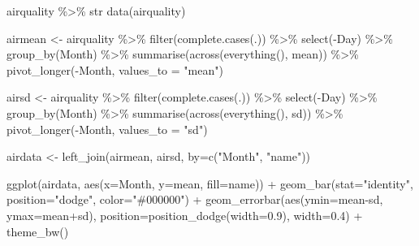 \documentclass[
]{book}
\newenvironment{Shaded}{\begin{snugshade}}{\end{snugshade}}
\newcommand{\AttributeTok}[1]{\textcolor[rgb]{0.77,0.63,0.00}{#1}}
\newcommand{\FloatTok}[1]{\textcolor[rgb]{0.00,0.00,0.81}{#1}}
\newcommand{\FunctionTok}[1]{\textcolor[rgb]{0.00,0.00,0.00}{#1}}
\newcommand{\NormalTok}[1]{#1}
\newcommand{\OtherTok}[1]{\textcolor[rgb]{0.56,0.35,0.01}{#1}}
\newcommand{\SpecialCharTok}[1]{\textcolor[rgb]{0.00,0.00,0.00}{#1}}
\newcommand{\StringTok}[1]{\textcolor[rgb]{0.31,0.60,0.02}{#1}}
\begin{document}
\begin{Shaded}
\begin{Highlighting}[]
\NormalTok{airquality }\SpecialCharTok{\%\textgreater{}\%}\NormalTok{ str}
\FunctionTok{data}\NormalTok{(airquality)}

\NormalTok{airmean }\OtherTok{\textless{}{-}}\NormalTok{  airquality }\SpecialCharTok{\%\textgreater{}\%} 
  \FunctionTok{filter}\NormalTok{(}\FunctionTok{complete.cases}\NormalTok{(.)) }\SpecialCharTok{\%\textgreater{}\%} 
  \FunctionTok{select}\NormalTok{(}\SpecialCharTok{{-}}\NormalTok{Day) }\SpecialCharTok{\%\textgreater{}\%} 
  \FunctionTok{group\_by}\NormalTok{(Month) }\SpecialCharTok{\%\textgreater{}\%} 
  \FunctionTok{summarise}\NormalTok{(}\FunctionTok{across}\NormalTok{(}\FunctionTok{everything}\NormalTok{(), mean)) }\SpecialCharTok{\%\textgreater{}\%} 
  \FunctionTok{pivot\_longer}\NormalTok{(}\SpecialCharTok{{-}}\NormalTok{Month, }\AttributeTok{values\_to =} \StringTok{"mean"}\NormalTok{)}

\NormalTok{airsd }\OtherTok{\textless{}{-}}\NormalTok{ airquality }\SpecialCharTok{\%\textgreater{}\%} 
  \FunctionTok{filter}\NormalTok{(}\FunctionTok{complete.cases}\NormalTok{(.)) }\SpecialCharTok{\%\textgreater{}\%} 
  \FunctionTok{select}\NormalTok{(}\SpecialCharTok{{-}}\NormalTok{Day) }\SpecialCharTok{\%\textgreater{}\%} 
  \FunctionTok{group\_by}\NormalTok{(Month) }\SpecialCharTok{\%\textgreater{}\%} 
  \FunctionTok{summarise}\NormalTok{(}\FunctionTok{across}\NormalTok{(}\FunctionTok{everything}\NormalTok{(), sd)) }\SpecialCharTok{\%\textgreater{}\%} 
  \FunctionTok{pivot\_longer}\NormalTok{(}\SpecialCharTok{{-}}\NormalTok{Month, }\AttributeTok{values\_to =} \StringTok{"sd"}\NormalTok{)}


\NormalTok{airdata }\OtherTok{\textless{}{-}} \FunctionTok{left\_join}\NormalTok{(airmean, airsd, }\AttributeTok{by=}\FunctionTok{c}\NormalTok{(}\StringTok{"Month"}\NormalTok{, }\StringTok{"name"}\NormalTok{))}

\FunctionTok{ggplot}\NormalTok{(airdata, }\FunctionTok{aes}\NormalTok{(}\AttributeTok{x=}\NormalTok{Month, }
                    \AttributeTok{y=}\NormalTok{mean, }
                    \AttributeTok{fill=}\NormalTok{name)) }\SpecialCharTok{+}
  \FunctionTok{geom\_bar}\NormalTok{(}\AttributeTok{stat=}\StringTok{"identity"}\NormalTok{, }
           \AttributeTok{position=}\StringTok{"dodge"}\NormalTok{,}
           \AttributeTok{color=}\StringTok{"\#000000"}\NormalTok{) }\SpecialCharTok{+}
  \FunctionTok{geom\_errorbar}\NormalTok{(}\FunctionTok{aes}\NormalTok{(}\AttributeTok{ymin=}\NormalTok{mean}\SpecialCharTok{{-}}\NormalTok{sd,}
                    \AttributeTok{ymax=}\NormalTok{mean}\SpecialCharTok{+}\NormalTok{sd),}
                \AttributeTok{position=}\FunctionTok{position\_dodge}\NormalTok{(}\AttributeTok{width=}\FloatTok{0.9}\NormalTok{), }
                \AttributeTok{width=}\FloatTok{0.4}\NormalTok{) }\SpecialCharTok{+}
  \FunctionTok{theme\_bw}\NormalTok{()}
\end{Highlighting}
\end{Shaded}
\end{document}
